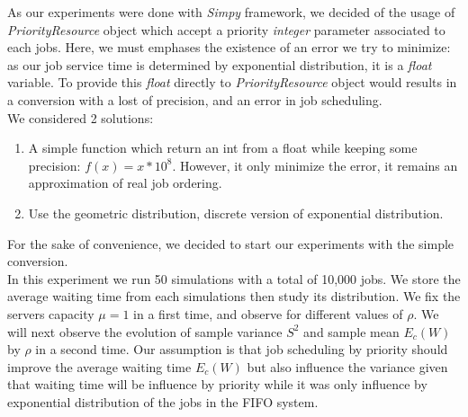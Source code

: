 \documentclass{article}
\begin{document}
    As our experiments were done with \emph{Simpy} framework, we decided of the usage of \emph{PriorityResource} object which accept a priority \emph{integer} parameter associated to each jobs.
    Here, we must emphases the existence of an error we try to minimize: as our job service time is determined by exponential distribution, it is a \emph{float} variable. To provide this \emph{float} directly to \emph{PriorityResource} object would results in a conversion with a lost of precision, and an error in job scheduling.\\
    We considered 2 solutions:
    \begin{enumerate}
        \item A simple function which return an int from a float while keeping some precision: $f(x) = x * 10^8$. However, it only minimize the error, it remains an approximation of real job ordering.
        \item Use the geometric distribution, discrete version of exponential distribution.
    \end{enumerate}
    For the sake of convenience, we decided to start our experiments with the simple conversion.\\

    In this experiment we run 50 simulations with a total of 10,000 jobs. We store the average waiting time from each simulations then study its distribution. We fix the servers capacity $\mu = 1$ in a first time, and observe for different values of $\rho$. We will next observe the evolution of sample variance $S^2$ and sample mean $E_c(W)$ by $\rho$ in a second time.
    Our assumption is that job scheduling by priority should improve the average waiting time $E_c(W)$ but also influence the variance given that waiting time will be influence by priority while it was only influence by exponential distribution of the jobs in the FIFO system.
\end{document}
